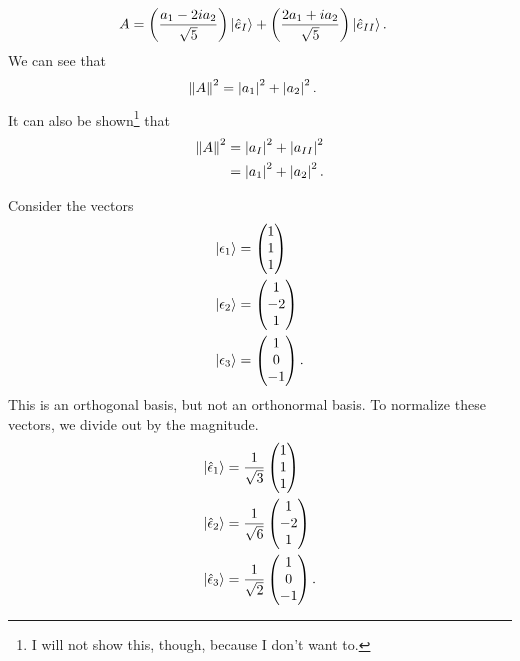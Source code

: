 \documentclass[10pt]{mypackage}
\newcommand{\ep}{\epsilon}
\begin{document}
\begin{example}
\begin{align*}
    A &= \left(\frac{a_1 - 2ia_2}{\sqrt{5}}\right)\ket{\hat{e}_{I}} + \left(\frac{2a_1 + ia_2}{\sqrt{5}}\right)\ket{\hat{e}_{II}}.
  \end{align*}
  We can see that
  \begin{align*}
    \norm{A}^2 &= \left\vert a_1 \right\vert^2 + \left\vert a_2 \right\vert^2.
  \end{align*}
  It can also be shown\footnote{I will not show this, though, because I don't want to.} that
  \begin{align*}
    \norm{A}^2 &= \left\vert a_{I} \right\vert^2 + \left\vert a_{II} \right\vert^2\\
               &= \left\vert a_1 \right\vert^2 + \left\vert a_2 \right\vert^2.
  \end{align*}
\end{example}
\begin{example}
  Consider the vectors
  \begin{align*}
    \ket{\ep_1} &= \begin{pmatrix}1\\1\\1\end{pmatrix}\\
    \ket{\ep_2} &= \begin{pmatrix}1\\-2\\1\end{pmatrix}\\
    \ket{\ep_3} &= \begin{pmatrix}1\\0\\-1\end{pmatrix}.
  \end{align*}
  This is an orthogonal basis, but not an orthonormal basis. To normalize these vectors, we divide out by the magnitude.
  \begin{align*}
    \ket{\hat{\ep}_{1}} &= \frac{1}{\sqrt{3}} \begin{pmatrix}1\\1\\1\end{pmatrix}\\
    \ket{\hat{\ep}_{2}} &= \frac{1}{\sqrt{6}}\begin{pmatrix}1\\-2\\1\end{pmatrix}\\
    \ket{\hat{\ep}_{3}} &= \frac{1}{\sqrt{2}} \begin{pmatrix}1\\0\\-1\end{pmatrix}.

\end{align*}
\end{example}
\end{document}
